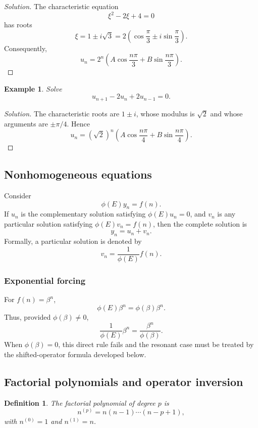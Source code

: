 \documentclass[11pt,a4paper]{article}
\numberwithin{equation}{section}
\theoremstyle{spacedplain}
\theoremstyle{spaceddefinition}
\newtheorem{definition}[theorem]{Definition}
\newtheorem{example}[theorem]{Example}
\theoremstyle{spacedremark}
\begin{document}
\begin{proof}[Solution]
The characteristic equation
\[
  \xi^2-2\xi+4=0
\]
has roots
\[
  \xi=1\pm i\sqrt{3}
  =2\left(\cos\frac{\pi}{3}\pm i\sin\frac{\pi}{3}\right).
\]
Consequently,
\[
  \boxed{
  u_n=2^n\left(
    A\cos\frac{n\pi}{3}+B\sin\frac{n\pi}{3}
  \right).}
\]
\end{proof}

\begin{example}
Solve
\[
  u_{n+1}-2u_n+2u_{n-1}=0.
\]
\end{example}

\begin{proof}[Solution]
The characteristic roots are \(1\pm i\), whose modulus is \(\sqrt{2}\)
and whose arguments are \(\pm\pi/4\).  Hence
\[
  \boxed{
  u_n=(\sqrt{2})^n\left(
    A\cos\frac{n\pi}{4}+B\sin\frac{n\pi}{4}
  \right).}
\]
\end{proof}

\subsection{Nonhomogeneous equations}

Consider
\[
  \phi(E)y_n=f(n).
\]
If \(u_n\) is the complementary solution satisfying
\(\phi(E)u_n=0\), and \(v_n\) is any particular solution satisfying
\(\phi(E)v_n=f(n)\), then the complete solution is
\[
  y_n=u_n+v_n.
\]
Formally, a particular solution is denoted by
\[
  v_n=\frac{1}{\phi(E)}f(n).
\]

\subsubsection{Exponential forcing}

For \(f(n)=\beta^n\),
\[
  \phi(E)\beta^n=\phi(\beta)\beta^n.
\]
Thus, provided \(\phi(\beta)\ne0\),
\[
  \boxed{
  \frac{1}{\phi(E)}\beta^n
  =\frac{\beta^n}{\phi(\beta)}.}
\]
When \(\phi(\beta)=0\), this direct rule fails and the resonant case must
be treated by the shifted-operator formula developed below.

\subsection{Factorial polynomials and operator inversion}

\begin{definition}
The factorial polynomial of degree \(p\) is
\[
  n^{(p)}=n(n-1)\cdots(n-p+1),
\]
with \(n^{(0)}=1\) and \(n^{(1)}=n\).
\end{definition}
\end{document}
